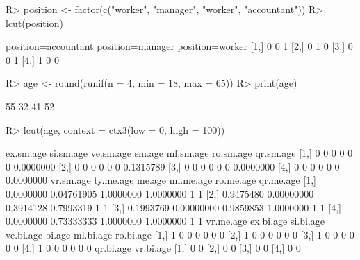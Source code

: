 \documentclass{article}\usepackage[]{graphicx}\usepackage[]{color}
\begin{document}
\begin{Schunk}
% --begin: "lcut.factor"
\begin{Sinput}
R> position <- factor(c("worker", "manager", "worker", "accountant"))
R> lcut(position)
\end{Sinput}
\begin{Soutput}
     position=accountant position=manager position=worker
[1,]                   0                0               1
[2,]                   0                1               0
[3,]                   0                0               1
[4,]                   1                0               0
\end{Soutput}
%
% --end: "lcut.factor"
\end{Schunk}

\begin{Schunk}
% --begin: "lcut.numeric"
\begin{Sinput}
R> age <- round(runif(n = 4, min = 18, max = 65))
R> print(age)
\end{Sinput}
\begin{Soutput}
[1] 55 32 41 52
\end{Soutput}
\begin{Sinput}
R> lcut(age, context = ctx3(low = 0, high = 100))
\end{Sinput}
\begin{Soutput}
     ex.sm.age si.sm.age ve.sm.age sm.age ml.sm.age ro.sm.age qr.sm.age
[1,]         0         0         0      0         0         0 0.0000000
[2,]         0         0         0      0         0         0 0.1315789
[3,]         0         0         0      0         0         0 0.0000000
[4,]         0         0         0      0         0         0 0.0000000
     vr.sm.age  ty.me.age    me.age ml.me.age ro.me.age qr.me.age
[1,] 0.0000000 0.04761905 1.0000000 1.0000000         1         1
[2,] 0.9475480 0.00000000 0.3914128 0.7993319         1         1
[3,] 0.1993769 0.00000000 0.9859853 1.0000000         1         1
[4,] 0.0000000 0.73333333 1.0000000 1.0000000         1         1
     vr.me.age ex.bi.age si.bi.age ve.bi.age bi.age ml.bi.age ro.bi.age
[1,]         1         0         0         0      0         0         0
[2,]         1         0         0         0      0         0         0
[3,]         1         0         0         0      0         0         0
[4,]         1         0         0         0      0         0         0
     qr.bi.age vr.bi.age
[1,]         0         0
[2,]         0         0
[3,]         0         0
[4,]         0         0
\end{Soutput}
%
% --end: "lcut.numeric"
\end{Schunk}
\end{document}
